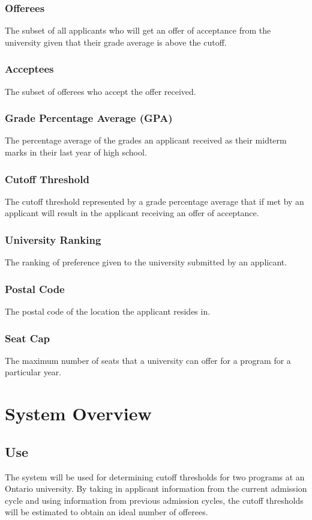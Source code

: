 \documentclass{article}
\begin{document}
\begin{normalsize}
    \subsubsection{Offerees}
        The subset of all applicants who will get an offer of acceptance from the university given that their grade average is above the cutoff.
    \subsubsection{Acceptees}
        The subset of offerees who accept the offer received.
    \subsubsection{Grade Percentage Average (GPA)}
        The percentage average of the grades an applicant received as their midterm marks in their last year of high school.
    \subsubsection{Cutoff Threshold}
        The cutoff threshold represented by a grade percentage average that if met by an applicant will result in the applicant receiving an offer of acceptance.
    \subsubsection{University Ranking}
        The ranking of preference given to the university  submitted by an applicant.
	 \subsubsection{Postal Code}
	    The postal code of the location the applicant resides in.
	 \subsubsection{Seat Cap}
	    The maximum number of seats that a university can offer for a program for a particular year.
        
    \section{System Overview}
        \subsection{Use}
        The system will be used for determining cutoff thresholds for two programs at an Ontario university. \newline
        \indent By taking in applicant information from the current admission cycle and using information from previous admission cycles, the cutoff thresholds will be estimated to obtain an ideal number of offerees.
        

\end{normalsize}
\end{document}
